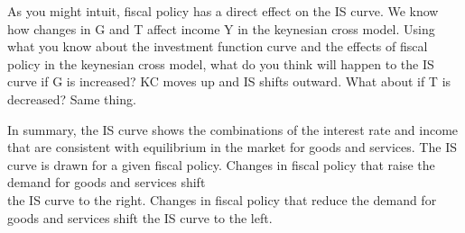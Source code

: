 \documentclass[10pt]{article}
\begin{document}
As you might intuit, fiscal policy has a direct effect on the IS curve. We know how changes in G and T affect income Y in the keynesian cross model. Using what you know about the investment function curve and the effects of fiscal policy in the keynesian cross model, what do you think will happen to the IS curve if G is increased? KC moves up and IS shifts outward. What about if T is decreased? Same thing.

In summary, the IS curve shows the combinations of the interest rate and income that are consistent with equilibrium in the market for goods and services. The IS curve is drawn for a given fiscal policy. Changes in fiscal policy that raise the demand for goods and services shift\\
the IS curve to the right. Changes in fiscal policy that reduce the demand for goods and services shift the IS curve to the left.
\end{document}
